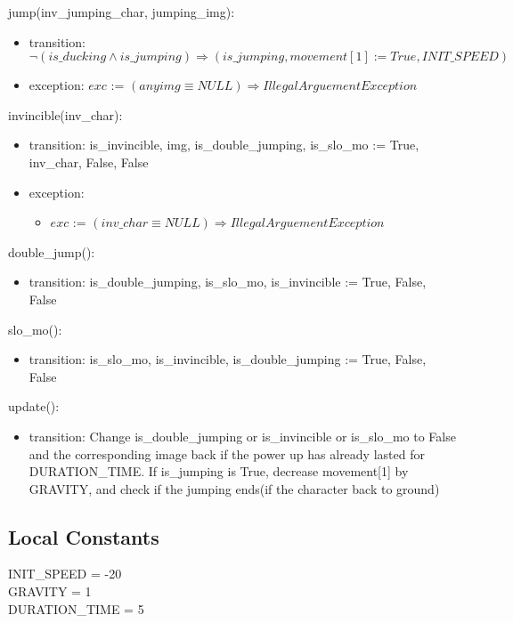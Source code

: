 \documentclass[12pt]{article}
\begin{document}
\noindent jump(inv\_jumping\_char, jumping\_img):
\begin{itemize}
\item transition: $\neg (is\_ducking \land is\_jumping) \Rightarrow (is\_jumping, movement[1] := True, INIT\_SPEED)$\\
\item exception: $exc$ := $(any img \equiv NULL) \Rightarrow IllegalArguementException$
\end{itemize}

\noindent invincible(inv\_char):
\begin{itemize}
\item transition: is\_invincible, img, is\_double\_jumping, is\_slo\_mo := True, inv\_char, False, False\\
\item exception:
    \begin{itemize}[]
        \item   $exc$ := $(inv\_char \equiv NULL) \Rightarrow IllegalArguementException$
    \end{itemize}
\end{itemize}

\noindent double\_jump():
\begin{itemize}
\item transition: is\_double\_jumping, is\_slo\_mo, is\_invincible := True, False, False\\
\end{itemize}

\noindent slo\_mo():
\begin{itemize}
\item transition: is\_slo\_mo, is\_invincible, is\_double\_jumping := True, False, False\\
\end{itemize}

\noindent update():
\begin{itemize}
\item transition: Change is\_double\_jumping or is\_invincible or is\_slo\_mo to False and the corresponding image back if the power up has already lasted for DURATION\_TIME. If is\_jumping is True, decrease movement[1] by GRAVITY, and check if the jumping ends(if the character back to ground)
\end{itemize}
\subsection*{Local Constants}
INIT\_SPEED = -20\\
GRAVITY = 1\\
DURATION\_TIME = 5\\
\medskip
\newpage
\end{document}
